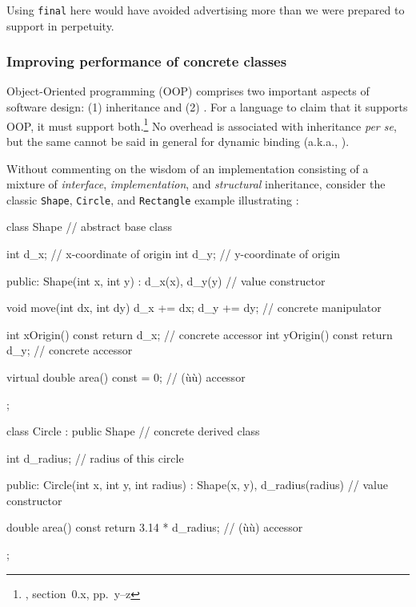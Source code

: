 {{\noindent Using \lstinline!final! here would have avoided advertising more than we
were prepared to support in perpetuity.

\subsubsection[Improving performance of concrete classes]{Improving performance of concrete classes}\label{improving-performance-of-concrete-classes}

Object-Oriented programming (OOP) comprises two important aspects of
software design: (1) inheritance and (2) . For a
language to claim that it supports OOP, it must support
both.{\cprotect\footnote{\cite{stroustrup91}, section~0.x, pp.~y--z}} No
overhead is associated with inheritance \emph{per se}, but the same
cannot be said in general for dynamic binding (a.k.a., ).

Without commenting on the wisdom of an implementation consisting of a
mixture of \emph{interface}, \emph{implementation}, and
\emph{structural} inheritance, consider the classic \lstinline!Shape!,
\lstinline!Circle!, and \lstinline!Rectangle! example illustrating
:

\begin{emcppslisting}[emcppsbatch=e4]
class Shape  // abstract base class
{
    int d_x;  // x-coordinate of origin
    int d_y;  // y-coordinate of origin

public:
    Shape(int x, int y) : d_x(x), d_y(y) { }    // value constructor

    void move(int dx, int dy) { d_x += dx; d_y += dy; }
                                                // concrete manipulator

    int xOrigin() const { return d_x; }         // concrete accessor
    int yOrigin() const { return d_y; }         // concrete accessor

    virtual double area() const = 0;            // (ù{}ù) accessor
};

class Circle : public Shape  // concrete derived class
{
    int d_radius;  // radius of this circle

public:
    Circle(int x, int y, int radius) : Shape(x, y), d_radius(radius) { }
                                                // value constructor

    double area() const { return 3.14 * d_radius; }
                                                // (ù{}ù) accessor
};


\end{emcppslisting}}}
